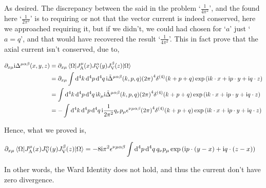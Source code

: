 As desired. The discrepancy between the said in the problem `$\frac{1}{4\pi^2}$', and the 
found here `$\frac{1}{2\pi^2}$' is to requiring or not that the vector current is indeed 
conserved, here we approached requiring it, but if we didn't, we could had chosen for `$a$' just 
`$a=q$', and that would have recovered the result `$\frac{1}{4\pi^2}$'. This in fact prove that the axial current isn't conserved, due to,

\begin{align}
    \partial_{x\mu}\textnormal{i}\Delta^{\mu\alpha\beta}\qty(x,y,z)&=\partial_{x\mu}\mel{\Omega}{J^\mu_{\textnormal {A}}\qty(x)J^\alpha_{\textnormal V}\qty(y)J^\beta_{\textnormal V}\qty(z)}{\Omega}\nonumber\\
    &=\partial_{x\mu}\int\dd[4]{k}\dd[4]{p}\dd[4]{q}\textnormal{i}{\tilde\Delta}^{\mu\alpha\beta}\qty(k,p,q)\qty(2\pi)^4\delta^{\qty(4)}\qty(k+p+q)\exp\qty(\textnormal{i} k\cdot x+\textnormal{i} p\cdot y+\textnormal{i} q\cdot z)\nonumber\\
    &=\int\dd[4]{k}\dd[4]{p}\dd[4]{q}\textnormal{i} k_\mu\textnormal{i}{\tilde\Delta}^{\mu\alpha\beta}\qty(k,p,q)\qty(2\pi)^4\delta^{\qty(4)}\qty(k+p+q)\exp\qty(\textnormal{i} k\cdot x+\textnormal{i} p\cdot y+\textnormal{i} q\cdot z)\nonumber\\
    &=-\int\dd[4]{k}\dd[4]{p}\dd[4]{q}\textnormal{i} \frac{1}{2\pi^2}q_\nu p_\mu
    \epsilon^{\nu\mu\alpha\beta}\qty(2\pi)^4\delta^{\qty(4)}\qty(k+p+q)\exp\qty(\textnormal{i} k\cdot x+\textnormal{i} p\cdot y+\textnormal{i} q\cdot z)\nonumber
\end{align}

Hence, what we proved is,

\begin{align}
    \partial_{x\mu}\mel{\Omega}{J^\mu_{\textnormal {A}}\qty(x)J^\alpha_{\textnormal V}\qty(y)J^\beta_{\textnormal V}\qty(z)}{\Omega}&=-8\textnormal{i}\pi^2\epsilon^{\nu\mu\alpha\beta}\int\dd[4]{p}\dd[4]{q} q_\nu p_\mu
    \exp\qty(\textnormal{i} p\cdot\qty( y-x)+\textnormal{i} q\cdot\qty( z-x))\nonumber
\end{align}

In other words, the Ward Identity does not hold, and thus the current don't have zero divergence.